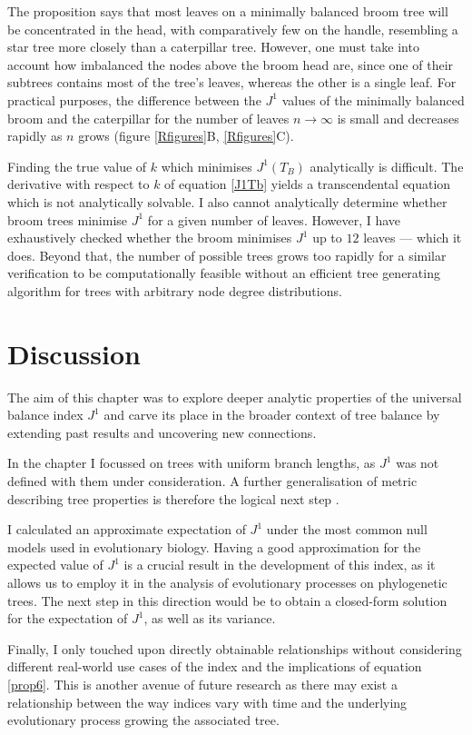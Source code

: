 The proposition says that most leaves on a minimally balanced broom tree will be
concentrated in the head, with comparatively few on the handle, resembling a
star tree more closely than a caterpillar tree. However, one must take into
account how imbalanced the nodes above the broom head are, since one of their
subtrees contains most of the tree's leaves, whereas the other is a single leaf.
For practical purposes, the difference between the $J^1$ values of the minimally
balanced broom and the caterpillar for the number of leaves $n\to\infty$ is
small and decreases rapidly as $n$ grows (figure \ref{Rfigures}B,
\ref{Rfigures}C). \par
Finding the true value of $k$ which minimises $J^1(T_B)$ analytically is
difficult. The derivative with respect to $k$ of equation \eqref{J1Tb} yields a
transcendental equation which is not analytically solvable. I also cannot
analytically determine whether broom trees minimise $J^1$ for a given number of
leaves. However, I have exhaustively checked whether the broom minimises $J^1$ up
to $12$ leaves --- which it does. Beyond that, the number of possible trees
grows too rapidly for a similar verification to be computationally feasible
without an efficient tree generating algorithm for trees with arbitrary node
degree distributions.

\section{Discussion}
The aim of this chapter was to explore deeper analytic properties of the universal
balance index $J^1$ and carve its place in the broader context of tree balance
by extending past results and uncovering new connections. \par
In the chapter I focussed on trees with uniform branch lengths, as $J^1$ was not
defined with them under consideration. A further generalisation of metric
describing tree properties is therefore the logical next step
\citep{noble_new_2023}. \par
I calculated an approximate expectation of $J^1$ under the most common null
models used in evolutionary biology. Having a good approximation for the
expected value of $J^1$ is a crucial result in the development of this index,
as it allows us to employ it in the analysis of evolutionary processes on
phylogenetic trees. The next step in this direction would be to obtain a
closed-form solution for the expectation of $J^1$, as well as its variance.\par
Finally, I only touched upon directly obtainable relationships without
considering different real-world use cases of the index and the implications of
equation \eqref{prop6}. This is another avenue of future research as there may
exist a relationship between the way indices vary with time and the underlying
evolutionary process growing the associated tree.

